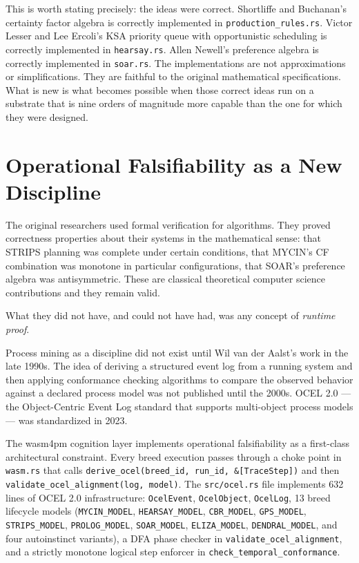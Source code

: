 This is worth stating precisely: the ideas were correct. Shortliffe and Buchanan's certainty
factor algebra is correctly implemented in \texttt{production\_rules.rs}. Victor Lesser and Lee
Ercoli's KSA priority queue with opportunistic scheduling is correctly implemented in
\texttt{hearsay.rs}. Allen Newell's preference algebra is correctly implemented in
\texttt{soar.rs}. The implementations are not approximations or simplifications. They are
faithful to the original mathematical specifications. What is new is what becomes possible when
those correct ideas run on a substrate that is nine orders of magnitude more capable than the
one for which they were designed.

\section{Operational Falsifiability as a New Discipline}
\label{sec:falsifiability}

The original researchers used formal verification for algorithms. They proved correctness
properties about their systems in the mathematical sense: that STRIPS planning was complete under
certain conditions, that MYCIN's CF combination was monotone in particular configurations, that
SOAR's preference algebra was antisymmetric. These are classical theoretical computer science
contributions and they remain valid.

What they did not have, and could not have had, was any concept of \emph{runtime proof}.

Process mining as a discipline did not exist until Wil van der Aalst's work in the late 1990s.
The idea of deriving a structured event log from a running system and then applying conformance
checking algorithms to compare the observed behavior against a declared process model was not
published until the 2000s. OCEL 2.0 --- the Object-Centric Event Log standard that supports
multi-object process models --- was standardized in 2023.

The wasm4pm cognition layer implements operational falsifiability as a first-class architectural
constraint. Every breed execution passes through a choke point in \texttt{wasm.rs} that calls
\texttt{derive\_ocel(breed\_id, run\_id, \&[TraceStep])} and then
\texttt{validate\_ocel\_alignment(log, model)}. The \texttt{src/ocel.rs} file implements 632
lines of OCEL 2.0 infrastructure: \texttt{OcelEvent}, \texttt{OcelObject}, \texttt{OcelLog},
13 breed lifecycle models (\texttt{MYCIN\_MODEL}, \texttt{HEARSAY\_MODEL}, \texttt{CBR\_MODEL},
\texttt{GPS\_MODEL}, \texttt{STRIPS\_MODEL}, \texttt{PROLOG\_MODEL}, \texttt{SOAR\_MODEL},
\texttt{ELIZA\_MODEL}, \texttt{DENDRAL\_MODEL}, and four autoinstinct variants), a DFA phase
checker in \texttt{validate\_ocel\_alignment}, and a strictly monotone logical step enforcer in
\texttt{check\_temporal\_conformance}.

